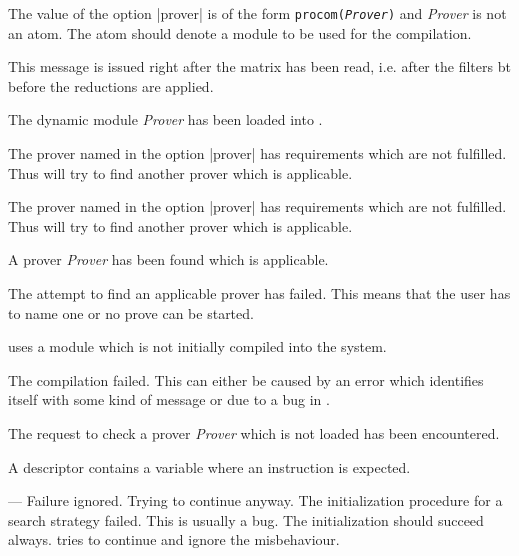 \begin{description}\itemsep=0pt
  The value of the option |prover| is of the form {\tt procom({\em Prover}\/)}
  and {\em Prover}\/ is not an atom. The atom should denote a \CaPrI{} module
  to be used for the compilation.

  This message is issued right after the matrix has been read, i.e. after the
  filters bt before the reductions are applied.

  The dynamic \CaPrI{} module {\em Prover}\/ has been loaded into \ProTop.

  The prover named in the option |prover| has requirements which are not
  fulfilled. Thus \ProCom{} will try to find another prover which is
  applicable.

  The prover named in the option |prover| has requirements which are not
  fulfilled. Thus \ProCom{} will try to find another prover which is
  applicable.

  A prover {\em Prover}\/ has been found which is applicable.

  The attempt to find an applicable prover has failed. This means that the
  user has to name one or no prove can be started.

  \ProCom{} uses a module which is not initially compiled into the system.

  The compilation failed. This can either be caused by an error which
  identifies itself with some kind of message or due to a bug in \ProTop.

  The request to check a prover {\em Prover}\/ which is not loaded has been
  encountered.

  A descriptor contains a variable where an instruction is expected.

       {--- Failure ignored. Trying to continue anyway.}
  The initialization procedure for a search strategy failed. This is usually a
  bug. The initialization should succeed always. \ProCom{} tries to continue
  and ignore the misbehaviour.


\end{description}
